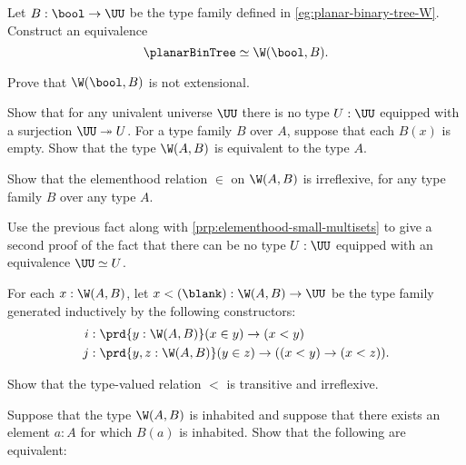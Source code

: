 \begin{exercises}
  \exitem
  \begin{subexenum}
  \item \label{ex:oriented-bin-tree}Let $B:\bool\to\UU$ be the type family defined in \cref{eg:planar-binary-tree-W}. Construct an equivalence
    \begin{equation*}
      \planarBinTree\simeq\W(\bool,B).
    \end{equation*}
  \item Prove that $\W(\bool,B)$ is not extensional.
  \end{subexenum}
  \exitem Show that for any univalent universe $\UU$ there is no type $U:\UU$ equipped with a surjection $\UU\twoheadrightarrow U$.
  \exitem For a type family $B$ over $A$, suppose that each $B(x)$ is empty. Show that the type $\W(A,B)$ is equivalent to the type $A$.
  \exitem
  \begin{subexenum}
  \item Show that the elementhood relation ${\in}$ on $\W(A,B)$ is irreflexive, for any type family $B$ over any type $A$.
  \item Use the previous fact along with \cref{prp:elementhood-small-multisets} to give a second proof of the fact that there can be no type $U:\UU$ equipped with an equivalence $\UU\simeq U$.
  \end{subexenum}
  \exitem \label{ex:le-W} For each $x:\W(A,B)$, let ${x <(\blank)}:\W(A,B)\to\UU$ be the type family generated inductively by the following constructors:
  \begin{align*}
    i & : \prd{y:\W(A,B)}(x\in y) \to (x < y) \\
    j & : \prd{y,z:\W(A,B)} (y\in z) \to ((x<y) \to (x<z)).
  \end{align*}
  \begin{subexenum}
  \item Show that the type-valued relation $<$ is transitive and irreflexive.
  \item Suppose that the type $\W(A,B)$ is inhabited and suppose that there exists an element $a:A$ for which $B(a)$ is inhabited. Show that the following are equivalent:

\end{subexenum}
\end{exercises}
